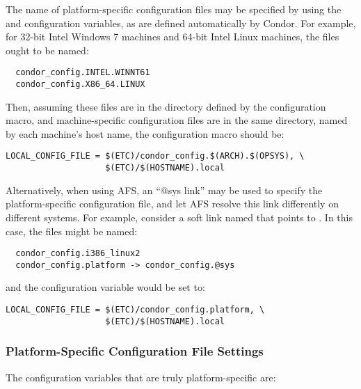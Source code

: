 The name of 
platform-specific configuration files may be specified by using the
 and  configuration variables, as are defined
automatically by Condor.
For example, for 32-bit Intel Windows 7
machines and 64-bit Intel Linux machines,
the files ought to be named:

\begin{verbatim}
  condor_config.INTEL.WINNT61
  condor_config.X86_64.LINUX
\end{verbatim}

Then, assuming these files are in the directory defined by the
 configuration macro,
and machine-specific configuration files are in
the same directory, named by each machine's host name, the
 configuration macro should be:

\footnotesize
\begin{verbatim}
LOCAL_CONFIG_FILE = $(ETC)/condor_config.$(ARCH).$(OPSYS), \
                    $(ETC)/$(HOSTNAME).local
\end{verbatim}
\normalsize

Alternatively, when using AFS, an ``@sys link'' may be used to
specify the platform-specific configuration file,
and let AFS resolve this link differently on different systems.
For example, consider
a soft link named  that points to
.  In this case, the files might be named:

\begin{verbatim}
  condor_config.i386_linux2
  condor_config.platform -> condor_config.@sys
\end{verbatim}

and the  configuration variable would be set to:

\footnotesize
\begin{verbatim}
LOCAL_CONFIG_FILE = $(ETC)/condor_config.platform, \
                    $(ETC)/$(HOSTNAME).local
\end{verbatim}
\normalsize

\subsubsection{\label{sec:Platform-Specific-Settings}Platform-Specific
Configuration File Settings}

The configuration variables that are truly platform-specific are:

